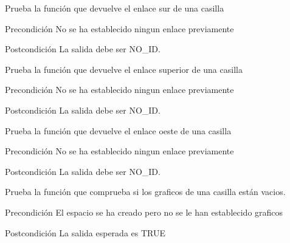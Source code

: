 \begin{DoxyRefList}
\item[\label{test__test000291}%
\hypertarget{test__test000291}{}%
Global \hyperlink{space__test_8c_a10f330eb696d1dbd1496d1bce20815fb}{test3\-\_\-space\-\_\-get\-\_\-south} ()]Prueba la función que devuelve el enlace sur de una casilla \begin{DoxyPrecond}{Precondición}
No se ha establecido ningun enlace previamente 
\end{DoxyPrecond}
\begin{DoxyPostcond}{Postcondición}
La salida debe ser N\-O\-\_\-\-I\-D.  
\end{DoxyPostcond}

\item[\label{test__test000300}%
\hypertarget{test__test000300}{}%
Global \hyperlink{space__test_8c_a57dc748a36eb182cdea5408bf2d0b41b}{test3\-\_\-space\-\_\-get\-\_\-up} ()]Prueba la función que devuelve el enlace superior de una casilla \begin{DoxyPrecond}{Precondición}
No se ha establecido ningun enlace previamente 
\end{DoxyPrecond}
\begin{DoxyPostcond}{Postcondición}
La salida debe ser N\-O\-\_\-\-I\-D.  
\end{DoxyPostcond}

\item[\label{test__test000297}%
\hypertarget{test__test000297}{}%
Global \hyperlink{space__test_8c_ad98e86c0beeeb65a7ee1cae1265a93d6}{test3\-\_\-space\-\_\-get\-\_\-west} ()]Prueba la función que devuelve el enlace oeste de una casilla \begin{DoxyPrecond}{Precondición}
No se ha establecido ningun enlace previamente 
\end{DoxyPrecond}
\begin{DoxyPostcond}{Postcondición}
La salida debe ser N\-O\-\_\-\-I\-D.  
\end{DoxyPostcond}

\item[\label{test__test000316}%
\hypertarget{test__test000316}{}%
Global \hyperlink{space__test_8c_ace126563c2a4531beb97320d0b4e1e61}{test3\-\_\-space\-\_\-graphics\-\_\-are\-Empty} ()]Prueba la función que comprueba si los graficos de una casilla están vacios. \begin{DoxyPrecond}{Precondición}
El espacio se ha creado pero no se le han establecido graficos 
\end{DoxyPrecond}
\begin{DoxyPostcond}{Postcondición}
La salida esperada es T\-R\-U\-E  
\end{DoxyPostcond}


\end{DoxyRefList}
